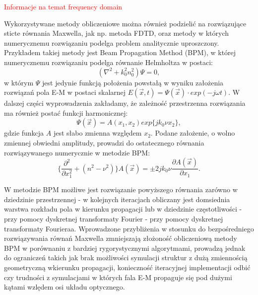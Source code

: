 \textcolor{red}{ Informacje na temat frequency domain}

Wykorzystywane metody obliczeniowe można również podzielić na rozwiązujące sticte równania Maxwella, jak np. metoda FDTD, oraz metody w których numerycznemu rozwiązaniu podelga problem analitycznie uproszczony. Przykładem takiej metody jest Beam Propagation Method (BPM), w której numerycznemu rozwiązaniu podelga równanie Helmholtza w postaci:
\begin{equation}
 ( \nabla ^2 + k_0^2 n_0^2) \Psi = 0,
\end{equation}
w którym $\Psi$ jest jedynie funkcją położenia powstałą w wyniku założenia rozwiązań pola E-M w postaci skalarnej $E(\vec{x},t)=\Psi(\vec{x})\cdot exp(-j\omega t)$. W dalszej części wyprowadzenia zakładamy, że zależność przestrzenna rozwiązania ma również postać funkcji harmonicznej:
\begin{equation}
\Psi(\vec{x})=A(x_1,x_2) exp\{jk_0\nu x_2\}, 
\end{equation}
gdzie funkcja $A$ jest słabo zmienna względem $x_2$. Podane założenie, o wolno zmiennej obwiedni amplitudy, prowadzi do ostatecznego równania rozwiązywanego numerycznie w metodzie BPM:
\begin{equation}
 \{  \frac{\partial^2 }{\partial x_1^2 } + (n^2 - \nu^2) \} A(\vec{x}) = \pm  2jk_0\nu \frac{\partial A (\vec{x})}{\partial x_1}.
\end{equation}

W metodzie BPM możliwe jest rozwiązanie powyższego równania zarówno w dziedzinie przestrzennej - w kolejnych iteracjach obliczany jest domsiednia warstwa rozkładu pola w kierunku propagacji lub w dziedzinie częstotliwości - przy pomocy dyskretnej transformaty Fourier - przy pomocy dyskretnej transformaty Fourieraa. Wprowadzone przybliżenia w stosunku do bezpośredniego rozwiązywania równań Maxwella zmniejszają złożoność obliczeniową metody BPM w porównaniu z bardziej rygorystycznymi algorytmami, prowadzą jednak do ograniczeń takich jak brak możliwości symulacji struktur z dużą zmiennością geometryczną wkierunku propagacji, konieczność iteracyjnej implementacji odbić czy trudności z symulacjami w których fala E-M propaguje się pod dużymi kątami wzlędem osi układu optycznego.



 

